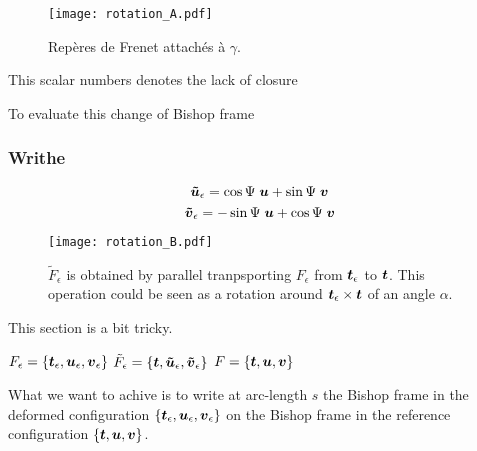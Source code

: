 \begin{figure}[t] 
\centering 
\texttt{[image: rotation\_A.pdf]} 
\caption{Repères de Frenet attachés à $\gamma$.}
\label{fig:1_1}
\end{figure}

This scalar numbers denotes the lack of closure 

To evaluate this change of Bishop frame

\subsubsection{Writhe}
\begin{equation}
	\boldsymbol{\tilde{u}}_\epsilon = \cos{\Psi}\;\boldsymbol{u} + \sin{\Psi}\;\boldsymbol{v}
\end{equation}
\begin{equation}
	\boldsymbol{\tilde{v}}_\epsilon = -\sin{\Psi}\;\boldsymbol{u} + \cos{\Psi}\;\boldsymbol{v}
\end{equation}

\begin{figure}[t] 
\centering 
\texttt{[image: rotation\_B.pdf]} 
\caption{$\tilde{F}_\epsilon$ is obtained by parallel tranpsporting $F_\epsilon$ from $\boldsymbol{t}_\epsilon$ to $\boldsymbol{t}$. This operation could be seen as a rotation around $\boldsymbol{t}_\epsilon \times \boldsymbol{t}$ of an angle $\alpha$.}
\label{fig:1_1}
\end{figure}

This section is a bit tricky.

$F_\epsilon = \{\boldsymbol{t}_\epsilon, \boldsymbol{u}_\epsilon,\boldsymbol{v}_\epsilon\}$
$\tilde{F}_\epsilon = \{\boldsymbol{t}, \boldsymbol{\tilde{u}}_\epsilon,\boldsymbol{\tilde{v}}_\epsilon\}$
$F = \{\boldsymbol{t}, \boldsymbol{u},\boldsymbol{v}\}$

What we want to achive is to write at arc-length $s$ the Bishop frame in the deformed configuration $\{\boldsymbol{t}_\epsilon, \boldsymbol{u}_\epsilon,\boldsymbol{v}_\epsilon\}$ on the Bishop frame in the reference configuration $\{\boldsymbol{t}, \boldsymbol{u},\boldsymbol{v}\}$.

